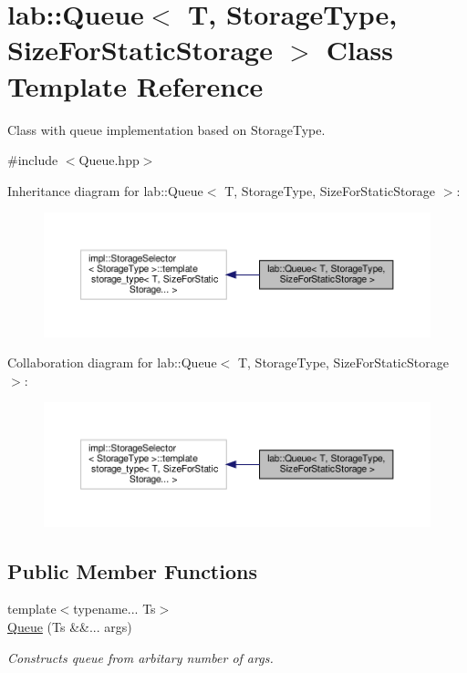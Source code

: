 \hypertarget{classlab_1_1Queue}{}\section{lab\+:\+:Queue$<$ T, Storage\+Type, Size\+For\+Static\+Storage $>$ Class Template Reference}
\label{classlab_1_1Queue}


Class with queue implementation based on {\ttfamily Storage\+Type}.  




{\ttfamily \#include $<$Queue.\+hpp$>$}



Inheritance diagram for lab\+:\+:Queue$<$ T, Storage\+Type, Size\+For\+Static\+Storage $>$\+:
\nopagebreak
\begin{figure}[H]
\begin{center}
\leavevmode
\includegraphics[width=350pt]{classlab_1_1Queue__inherit__graph}
\end{center}
\end{figure}


Collaboration diagram for lab\+:\+:Queue$<$ T, Storage\+Type, Size\+For\+Static\+Storage $>$\+:
\nopagebreak
\begin{figure}[H]
\begin{center}
\leavevmode
\includegraphics[width=350pt]{classlab_1_1Queue__coll__graph}
\end{center}
\end{figure}
\subsection*{Public Member Functions}
\begin{DoxyCompactItemize}
\item 
{\footnotesize template$<$typename... Ts$>$ }\\\hyperlink{classlab_1_1Queue_ae4b1fd4f3c92ac1ea001777879e87c58}{Queue} (Ts \&\&... args)
\begin{DoxyCompactList}\small\item\em Constructs queue from arbitary number of args. \end{DoxyCompactList}\end{DoxyCompactItemize}


